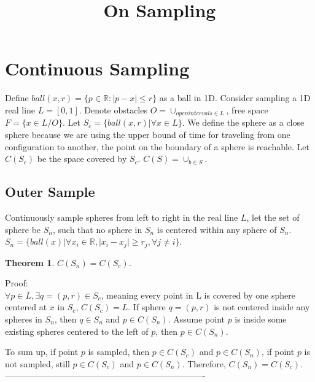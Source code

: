 \documentclass[12pt]{article}
\title{On Sampling}
\date{}
\newtheorem{theorem}{Theorem}[section]
\begin{document}
  \maketitle
  
  \section{Continuous Sampling}
  Define $ball( x, r ) = \{ p \in \mathbb{R}: |p-x| \leq r \}$ as a ball in 1D. Consider sampling a 1D real line $L = [0, 1]$. Denote obstacles $O = \cup_{open intervals \in L}$, free space $F = \{ x \in L/O \}$. Let $S_{c} = \{ball(x,r) | \forall x \in L\}$. We define the sphere as a close sphere because we are using the upper bound of time for traveling from one configuration to another, the point on the boundary of a sphere is reachable. Let $C(S_{c})$ be the space covered by $S_{c}$. $C(S) = \cup_{b \in S}.$\\
  
  \subsection{Outer Sample}  
  Continuously sample spheres from left to right in the real line $L$, let the set of sphere be $S_{n}$, such that no sphere in $S_{n}$ is centered within any sphere of $S_{n}$. $S_{n} = \{ball(x)| \forall x_{i} \in \mathbb{R}, |x_{i} - x_{j}| \geq r_{j}, \forall j \neq i \}$.
  
  \begin{theorem}
  $C(S_{n}) = C(S_{c})$.
  \end{theorem}
  
  Proof:\\
  
  $\forall p \in L, \exists q=(p,r) \in S_{c}$, meaning every point in L is covered by one sphere centered at $x$ in $S_{c}$, $C(S_{c}) = L$. If sphere $q=(p,r)$ is not centered inside any spheres in $S_{n}$, then $q \in S_{n}$ and $p \in C(S_{n})$. Assume point $p$ is inside some existing spheres centered to the left of $p$, then $p \in C(S_{n})$. 
  
  To sum up, if point $p$ is sampled, then $p \in C(S_{c})$ and $p \in C(S_{n})$, if point $p$ is not sampled, still $p \in C(S_{c})$ and $p \in C(S_{n})$. Therefore, $C(S_{n}) = C(S_{c})$.\\
  
  ---------------------------------------------------------------------- \\
  
\end{document}
